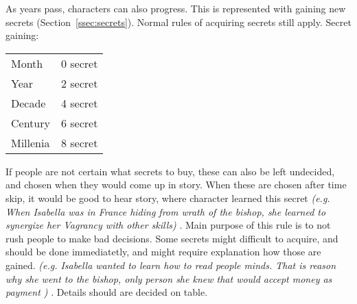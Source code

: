 As years pass, characters can also progress.
This is represented with gaining new secrets (Section~\ref{ssec:secrets}).
Normal rules of acquiring secrets still apply.
Secret gaining:
\begin{table}[h]
\begin{tabular}{ll}
Month & 0 secret \\
Year & 2 secret \\
Decade & 4 secret \\
Century & 6 secret \\
Millenia & 8 secret
\end{tabular}
\end{table}

If people are not certain what secrets to buy, these can also be left undecided, and chosen when they would come up in story.
When these are chosen after time skip, it would be good to hear story, where character learned this secret
   \textit{(e.g. When Isabella was in France hiding from wrath of the bishop, she learned to synergize her Vagrancy with other skills) }.
Main purpose of this rule is to not rush people to make bad decisions.
Some secrets might difficult to acquire, and should be done immediatetly, and might require explanation how those are gained.
   \textit{(e.g. Isabella wanted to learn how to read people minds. That is reason why she went to the bishop, only person she knew that would accept money as payment ) }.
Details should are decided on table.


